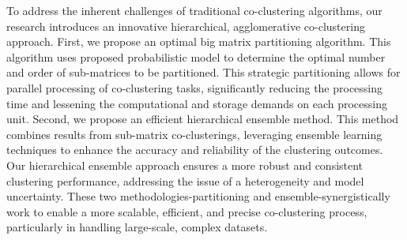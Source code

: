 To address the inherent challenges of traditional co-clustering algorithms, our research introduces an innovative hierarchical, agglomerative co-clustering approach. First,  we propose an optimal big matrix partitioning algorithm. This algorithm uses proposed probabilistic model to determine the optimal number and order of sub-matrices to be partitioned. This strategic partitioning allows for parallel processing of co-clustering tasks, significantly reducing the processing time and lessening the computational and storage demands on each processing unit.  
Second, we propose an efficient hierarchical ensemble method. This method combines results from sub-matrix co-clusterings, leveraging ensemble learning techniques to enhance the accuracy and reliability of the clustering outcomes. Our hierarchical ensemble approach ensures a more robust and consistent clustering performance, addressing the issue of a heterogeneity and model uncertainty. 
These two methodologies-partitioning and ensemble-synergistically work to enable a more scalable, efficient, and precise co-clustering process, particularly in handling large-scale, complex datasets.

